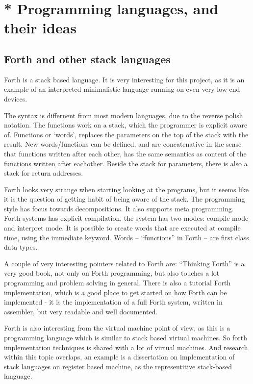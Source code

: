 \section{* Programming languages, and their ideas}
\subsection{Forth and other stack languages}
Forth is a stack based language.
It is very interesting for this project, as it is an example of an interpreted minimalistic language running on even very low-end devices.

The syntax is differnent from most modern languages, due to the reverse polish notation.
The functions work on a stack, which the programmer is explicit aware of. 
Functions or `words', replaces the parameters on the top of the stack with the result. 
New words/functions can be defined, and are concatenative in the sense that functions written after each other, has the same semantics as content of the functions written after eachother.
Beside the stack for parameters, there is also a stack for return addresses.

Forth looks very strange when starting looking at the programs, but it seems like it is the question of getting habit of being aware of the stack.
The programming style has focus towards decompositions. It also supports meta programming.
Forth systems has explicit compilation, the system has two modes: compile mode and interpret mode. 
It is possible to create words that are executed at compile time, using the immediate keyword.
Words -- ``functions'' in Forth -- are first class data types.

A couple of very interesting pointers related to Forth are: 
``Thinking Forth'' is a very good book, not only on Forth programming, but also touches a lot programming and problem solving in general.
There is also a tutorial Forth implementation\cite{jonesforth}, which is a good place to get started on how Forth can be implemented - it is the implementation of a full Forth system, written in assembler, but very readable and well documented.

Forth is also interesting from the virtual machine point of view, as this is a programming language which is similar to stack based virtual machines. So forth implementation techniques is shared with a lot of virtual machines. And research within this topic overlaps, an example is a dissertation on implementation of stack languages on register based machine\cite{ertl-dissertation}, as the representitive stack-based language.

